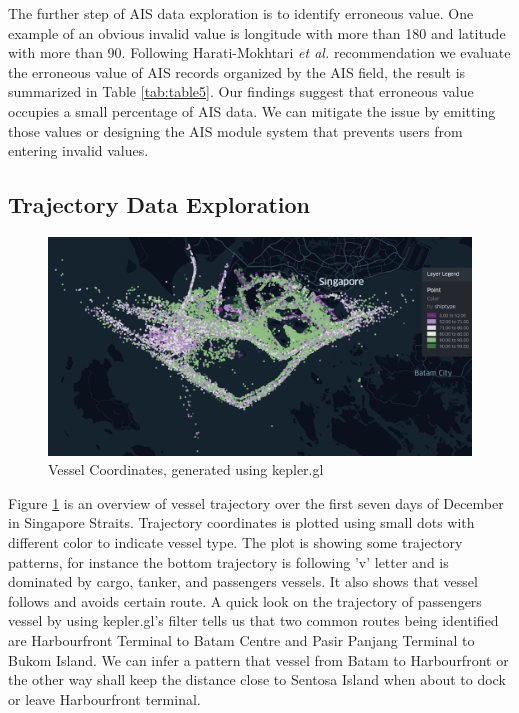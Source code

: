 The further step of AIS data exploration is to identify erroneous value. One example of an obvious invalid value is longitude with more than 180 and latitude with more than 90. Following Harati-Mokhtari \emph{et al.} \cite{harati2007automatic} recommendation we evaluate the erroneous value of AIS records organized by the AIS field, the result is summarized in Table \ref{tab:table5}. Our findings suggest that erroneous value occupies a small percentage of AIS data. We can mitigate the issue by emitting those values or designing the AIS module system that prevents users from entering invalid values.

\subsection{Trajectory Data Exploration}
\begin{figure}[t!]
    \centering
    \includegraphics[width=12cm]{pic/ch-eda/overview-legend.png}
    \caption{Vessel Coordinates, generated using kepler.gl}
    \label{fig:traj}
\end{figure}

Figure \ref{fig:traj} is an overview of vessel trajectory over the first seven days of December in Singapore Straits. Trajectory coordinates is plotted using small dots with different color to indicate vessel type. The plot is showing some trajectory patterns, for instance the bottom trajectory is following 'v' letter and is dominated by cargo, tanker, and passengers vessels. It also shows that vessel follows and avoids certain route. A quick look on the trajectory of passengers vessel by using kepler.gl's filter tells us that two common routes being identified are Harbourfront Terminal to Batam Centre and Pasir Panjang Terminal to Bukom Island. We can infer a pattern that vessel from Batam to Harbourfront or the other way shall keep the distance close to Sentosa Island when about to dock or leave Harbourfront terminal.

